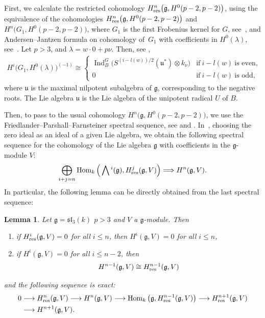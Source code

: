 \documentclass[pdftex]{sigma}%
\numberwithin{equation}{section}
\newtheorem{Lemma}[Theorem]{Lemma}
\begin{document}
First, we calculate the restricted cohomology
$H^n_{\rm res}\big(\mathfrak{g},H^0(p-2,p-2)\big)$, using the equivalence of the cohomologies $H^n_{\rm res}\big(\mathfrak{g},H^0(p-2,p-2)\big)$ and $H^n\big(G_1,H^0(p-2,p-2)\big)$, where $G_1$ is the first Frobenius kernel for $G$, see~\cite[Section~I.9.6]{Jan03}, and Andersen--Jantzen formula on cohomology of~$G_1$ with coefficients in $H^0(\lambda)$, see~\cite{AJ84}. Let $p>3$, and $\lambda=w\cdot 0+p\nu$. Then, see \cite[p.~501]{AJ84},
\begin{gather}
H^i\big(G_1,H^0(\lambda)\big)^{(-1)}\cong
\begin{cases}
\operatorname{Ind}_B^{G}\big(S^{(i-l(w))/2}(\mathfrak{u}^*)\otimes k_{\nu}\big)&\text{if} \ i-l(w)\ \text{is even},
\\
0&\text{if} \ i-l(w)\ \text{is odd},
\end{cases}
\label{eq13}
\end{gather}
where $\mathfrak{u}$ is the maximal nilpotent subalgebra of $\mathfrak{g}$, corresponding to the negative roots. The Lie algebra $\mathfrak{u}$ is the Lie algebra of the unipotent radical $U$ of $B$.

Then, to pass to the usual cohomology $H^n\big(\mathfrak{g},H^0(p-2,p-2)\big)$, we use the Friedlander--Parshall--Farnsteiner spectral sequence, see \cite[Section~5]{FP88} and \cite[Theorem~4.1]{F91}. In~\cite[Theo\-rem~4.1]{F91}, choosing the zero ideal as an ideal of a given Lie algebra, we obtain the following spectral sequence for the cohomology of the Lie algebra $\mathfrak{g}$ with coefficients in the $\mathfrak{g}$-module $V$:
\begin{gather*}
\bigoplus_{i+j=n}\operatorname{Hom}_k\Big(\bigwedge{^i}(\mathfrak{g}),H^j_{\rm res}(\mathfrak{g},V)\Big)\Longrightarrow H^n(\mathfrak{g},V).
\end{gather*}
In particular, the following lemma can be directly obtained from the last spectral sequence:

\begin{Lemma}\label{l5}
Let $\mathfrak{g}=\mathfrak{sl}_3(k)$
$p>3$ and $V$ a $\mathfrak{g}$-module. Then
\begin{enumerate}\itemsep=0pt

\item[$(i)$] if
$H^{i}_{\rm res}(\mathfrak{g},V)=0$ for all $i\leq n$, then $H^{i}(\mathfrak{g},V)=0$ for all $i\leq n$,

\item[$(ii)$] if $H^i(\mathfrak{g},V)=0$ for all $i\leq n-2$, then
\begin{gather}
H^{n-1}(\mathfrak{g},V)\cong H^{n-1}_{\rm res}(\mathfrak{g},V) \label{eq14}
\end{gather}
\end{enumerate}
and the following sequence is exact:
\begin{align}
0&\longrightarrow H^{n}_{\rm res}(\mathfrak{g},V)\longrightarrow H^{n}(\mathfrak{g},V)\longrightarrow \operatorname{Hom}_k\big(\mathfrak{g},H^{n-1}_{\rm res}(\mathfrak{g},V)\big)\longrightarrow H^{n+1}_{\rm res}(\mathfrak{g},V)\nonumber
\\
&\longrightarrow H^{n+1}(\mathfrak{g},V). \label{eq15}
\end{align}
\end{Lemma}
\end{document}

